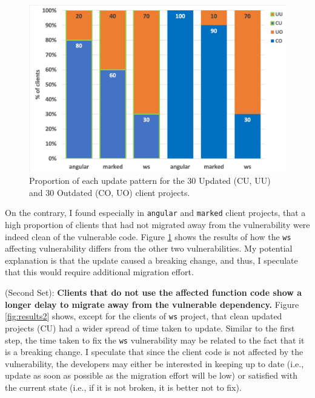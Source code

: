 \begin{figure}[ht]
\centering
\includegraphics[width=1\textwidth]{images/exploratory_results.png}
\caption{Proportion of each update pattern for the 30 Updated (CU, UU) and 30 Outdated (CO, UO) client projects.}
\label{fig:results1}
\end{figure}

On the contrary, I found especially in \texttt{angular} and \texttt{marked} client projects, that a high proportion of clients that had not migrated away from the vulnerability were indeed clean of the vulnerable code. 
Figure \ref{fig:results1} shows the results of how the \texttt{ws} affecting vulnerability differs from the other two vulnerabilities.
My potential explanation is that the update caused a breaking change, and thus, I speculate that this would require additional migration effort.

(Second Set): \textbf{Clients that do not use the affected function code show a longer delay to migrate away from the vulnerable dependency.} 
Figure \ref{fig:results2} shows, except for the clients of \texttt{ws} project, that clean updated projects (CU) had a wider spread of time taken to update. Similar to the first step, the time taken to fix the \texttt{ws} vulnerability may be related to the fact that it is a breaking change. I speculate that since the client code is not affected by the vulnerability, the developers may either be interested in keeping up to date (i.e., update as soon as possible as the migration effort will be low) or satisfied with the current state (i.e., if it is not broken, it is better not to fix).

